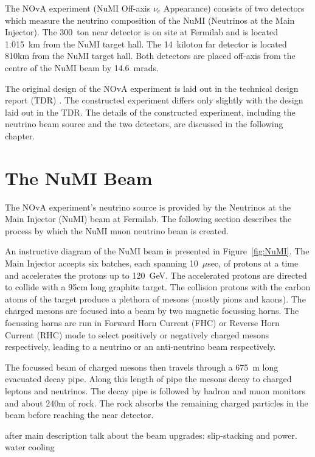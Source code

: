 
The NOvA experiment (NuMI Off-axis $\nu_e$ Appearance) consists of two
detectors which measure the neutrino composition of the NuMI
(Neutrinos at the Main Injector). The
300~ton near detector is on site at Fermilab and is located 1.015~km
from the NuMI
target hall. The 14~kiloton far detector is located 810km from the
NuMI target hall. Both detectors are placed off-axis from the centre
of the NuMI beam by 14.6~mrads.

The original design of the NOvA experiment is laid out in the
technical design report (TDR) \cite{TDR}. The constructed experiment
differs only slightly with the design laid out in the TDR. The details
of the constructed experiment, including the neutrino beam source and
the two detectors, are discussed in the following chapter.


\section{The NuMI Beam}

The NOvA experiment's neutrino source is provided by the Neutrinos at
the Main Injector (NuMI) beam at Fermilab. The following section
describes the process by which the NuMI muon neutrino beam is created.

An instructive diagram of the NuMI beam is presented in
Figure~\ref{fig:NuMI}.
The Main Injector accepts six batches, each spanning 10~$\mu$sec, of
protons at a time and accelerates the protons up to 120~GeV. The
accelerated protons are directed to collide with a 95cm long graphite
target. The collision protons with the carbon atoms of the target
produce a plethora of mesons (mostly pions and kaons). The charged
mesons are focused into a beam by two magnetic focussing horns. The
focussing horns are run in Forward Horn Current (FHC) or Reverse Horn
Current (RHC)
mode to select positively or negatively charged mesons
respectively, leading to a neutrino or an anti-neutrino beam respectively. 

The focussed beam of charged mesons then travels through a 675~m long
evacuated decay pipe. Along this length of pipe the mesons decay to charged
leptons and neutrinos. The decay pipe is followed by hadron and muon
monitors and about 240m of rock. The rock absorbs the remaining charged
particles in the beam before reaching the near detector.




after main description talk about the beam upgrades: slip-stacking
and power. water cooling 



